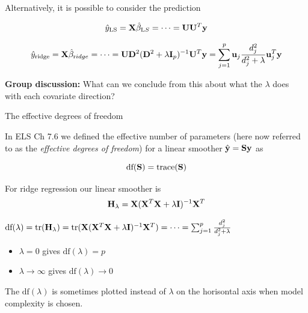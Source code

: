 \documentclass[
  ignorenonframetext,
]{beamer}
\providecommand{\tightlist}{%
  \setlength{\itemsep}{0pt}\setlength{\parskip}{0pt}}
\begin{document}
\begin{frame}

Alternatively, it is possible to consider the prediction

\[\hat{y}_{\text{LS}}={\bf X}\hat{\beta}_{\text LS}= \cdots = {\bf U}{\bf U}^T {\bf y}\]

\[\hat{y}_{\text{ridge}}={\bf X}\hat{\beta}_{\text ridge}= \cdots =
{\bf U}{\bf D}^2({\bf D}^2+\lambda {\bf I}_p)^{-1}{\bf U}^T {\bf y}=
\sum_{j=1}^p {\bf u}_j \frac{d_j^2}{d_j^2+\lambda}{\bf u}_j^T {\bf y}\]

\textbf{Group discussion:} What can we conclude from this about what the
\(\lambda\) does with each covariate direction?

\end{frame}

\begin{frame}

\begin{block}{The effective degrees of freedom}

In ELS Ch 7.6 we defined the effective number of parameters (here now
referred to as the \emph{effective degrees of freedom}) for a linear
smoother \(\hat{\bf y}={\bf Sy}\) as

\[\text{df}({\bf S})=\text{trace}({\bf S})\]

For ridge regression our linear smoother is
\[{\bf H}_{\lambda}={\bf X}({\bf X}^T{\bf X}+ \lambda {\bf I})^{-1}{\bf X}^T\]

\end{block}

\end{frame}

\begin{frame}

\(\text{df}(\lambda)=\text{tr}({\bf H}_{\lambda})=\text{tr}({\bf X}({\bf X}^T{\bf X}+ \lambda {\bf I})^{-1}{\bf X}^T)=\cdots=\sum_{j=1}^p \frac{d_j^2}{d_j^2+\lambda}\)

\begin{itemize}
\tightlist
\item
  \(\lambda=0\) gives \(\text{df}(\lambda)=p\)
\item
  \(\lambda \rightarrow \infty\) gives
  \(\text{df}(\lambda)\rightarrow 0\)
\end{itemize}

The \(\text{df}(\lambda)\) is sometimes plotted instead of \(\lambda\)
on the horisontal axis when model complexity is chosen.

\end{frame}
\end{document}
